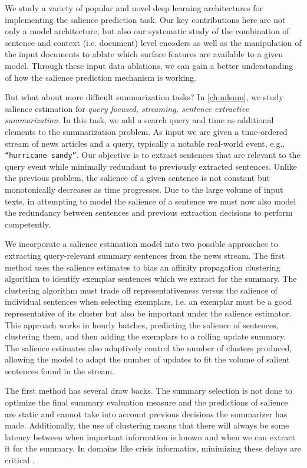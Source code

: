 We study a variety of popular and novel deep learning architectures for
implementing the salience prediction task. Our key contributions here are not
only a model architecture, but also our systematic study of the combination of
sentence and context (i.e. document) level encoders as well as the
manipulation of the input documents to ablate which surface features are
available to a given model. Through these input data ablations, we can gain a
better understanding of how the salience prediction mechanism is working.
 
But what about more difficult summarization tasks? In \autoref{ch:mlsum}, we
study salience estimation for \emph{query focused, streaming, sentence
extractive summarization}. In this task, we add a search query and time as
additional elements to the summarization problem. As input we are given a
time-ordered stream of news articles and a query, typically a notable
real-world event, e.g., \texttt{``hurricane sandy''}. Our objective is to
extract sentences that are relevant to the query event while minimally
redundant to previously extracted sentences. Unlike the previous problem, the
salience of a given sentence is not constant but monotonically decreases as
time progresses. Due to the large volume of input texts, in attempting to
model the salience of a sentence we must now also model the redundancy between
sentences and previous extraction decisions to perform competently.
      
We incorporate a salience estimation model into two possible approaches to
extracting query-relevant summary sentences from the news stream.  The first
method uses the salience estimates to bias an affinity propagation clustering
algorithm \citep{dueck2009} to identify exemplar sentences which we extract
for the summary.  The clustering algorithm must trade off representativeness
versus the salience of individual sentences when selecting exemplars, i.e. an
exemplar must be a good representative of its cluster but also be important
under the salience estimator.  This approach works in hourly batches,
predicting the salience of sentences, clustering them, and then adding the
exemplars to a rolling update summary. The salience estimates also adaptively
control the number of clusters produced, allowing the model to adapt the
number of updates to fit the volume of salient sentences found in the stream. 

The first method has several draw backs. The summary selection is not done to
optimize the final summary evaluation measure and the predictions of salience
are static and cannot take into account previous decisions the summarizer has
made. Additionally, the use of clustering means that there will always be some
latency between when important information is known and when we can extract it
for the summary. In domains like crisis informatics, minimizing these delays
are critical \citep{starbird2013}.

